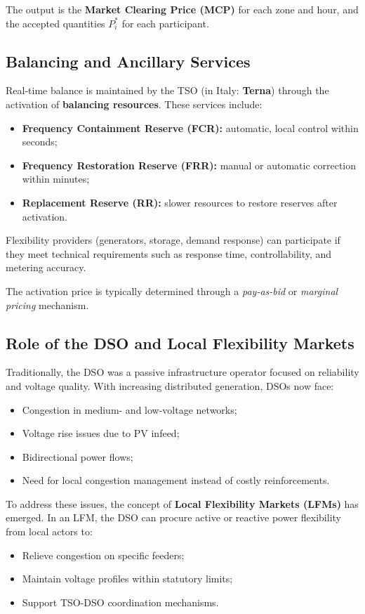 \documentclass[11pt]{article}
\begin{document}
	The output is the \textbf{Market Clearing Price (MCP)} for each zone and hour, and the accepted quantities $P_i^*$ for each participant.
	
	\subsection{Balancing and Ancillary Services}
	
	Real-time balance is maintained by the TSO (in Italy: \textbf{Terna}) through the activation of \textbf{balancing resources}.  
	These services include:
	\begin{itemize}
		\item \textbf{Frequency Containment Reserve (FCR):} automatic, local control within seconds;
		\item \textbf{Frequency Restoration Reserve (FRR):} manual or automatic correction within minutes;
		\item \textbf{Replacement Reserve (RR):} slower resources to restore reserves after activation.
	\end{itemize}
	
	Flexibility providers (generators, storage, demand response) can participate if they meet technical requirements such as response time, controllability, and metering accuracy.
	
	The activation price is typically determined through a \textit{pay-as-bid} or \textit{marginal pricing} mechanism.
	
	\subsection{Role of the DSO and Local Flexibility Markets}
	
	Traditionally, the DSO was a passive infrastructure operator focused on reliability and voltage quality.  
	With increasing distributed generation, DSOs now face:
	\begin{itemize}
		\item Congestion in medium- and low-voltage networks;
		\item Voltage rise issues due to PV infeed;
		\item Bidirectional power flows;
		\item Need for local congestion management instead of costly reinforcements.
	\end{itemize}
	
	To address these issues, the concept of \textbf{Local Flexibility Markets (LFMs)} has emerged.  
	In an LFM, the DSO can procure active or reactive power flexibility from local actors to:
	\begin{itemize}
		\item Relieve congestion on specific feeders;
		\item Maintain voltage profiles within statutory limits;
		\item Support TSO-DSO coordination mechanisms.
	\end{itemize}
	
\end{document}
